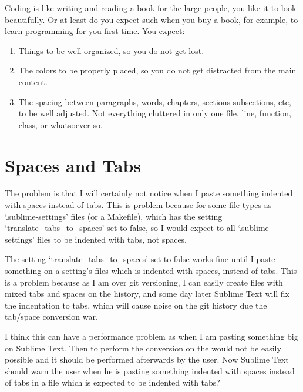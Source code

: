 \begin{englishtext}
    Coding is like writing and reading a book for the large people, you like it
    to look beautifully. Or at least do you expect such when you buy a book, for
    example, to learn programming for you first time. You expect: %

    \begin{enumerate}
        \item Things to be well organized, so you do not get lost.

        \item The colors to be properly placed, so you do not get distracted
           from the main content.

        \item The spacing between paragraphs, words, chapters, sections
           subsections, etc, to be well adjusted. Not everything cluttered in
           only one file, line, function, class, or whatsoever so.
    \end{enumerate}



    \section{Spaces and Tabs}

    The problem is that I will certainly not notice when I paste something
    indented with spaces instead of tabs. This is problem because for some file
    types as `.sublime-settings' files (or a Makefile), which has the setting
    `translate\_tabs\_to\_spaces' set to false, so I would expect to all
    `.sublime-settings' files to be indented with tabs, not spaces.
    \cite{tabsAndSpacesConversion}

    The setting `translate\_tabs\_to\_spaces' set to false works fine until I paste
    something on a setting's files which is indented with spaces, instead of
    tabs. This is a problem because as I am over git versioning, I can easily
    create files with mixed tabs and spaces on the history, and some day later
    Sublime Text will fix the indentation to tabs, which will cause noise on the
    git history due the tab/space conversion war. %

    I think this can have a performance problem as when I am pasting something
    big on Sublime Text. Then to perform the conversion on the would not be
    easily possible and it should be performed afterwards by the user. Now
    Sublime Text should warn the user when he is pasting something indented with
    spaces instead of tabs in a file which is expected to be indented with tabs?


\end{englishtext}
